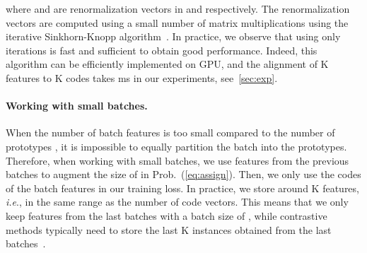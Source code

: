 \documentclass{article}
\def\onedot{.}
\def\ie{\emph{i.e}\onedot} \def\Ie{\emph{I.e}\onedot}
\begin{document}
where  and  are renormalization vectors in  and  respectively.
The renormalization vectors are computed using a small number of matrix multiplications using the iterative Sinkhorn-Knopp algorithm~\cite{cuturi2013sinkhorn}.
In practice, we observe that using only  iterations is fast and sufficient to obtain good performance.
Indeed, this algorithm can be efficiently implemented on GPU, and the alignment of K features to K codes takes ms in our experiments, see~\cref{sec:exp}.


\paragraph{Working with small batches.}
When the number  of batch features is too small compared to the number of prototypes , it is impossible to equally partition the batch into the  prototypes.
Therefore, when working with small batches, we use features from the previous batches to augment the size of  in Prob.~(\ref{eq:assign}).
Then, we only use the codes of the batch features in our training loss.
In practice, we store around K features, \ie, in the same range as the number of code vectors.
This means that we only keep features from the last  batches with a batch size of , while contrastive methods typically need to store the last K instances obtained from the last  batches~\cite{he2019momentum}.
\end{document}

